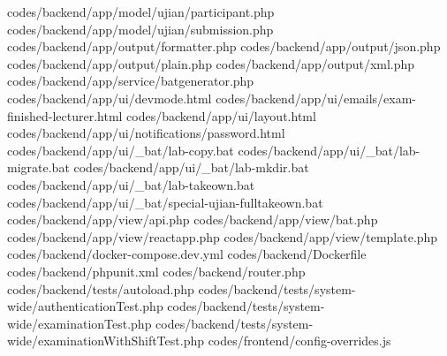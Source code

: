 codes/backend/app/model/ujian/participant.php
codes/backend/app/model/ujian/submission.php
codes/backend/app/output/formatter.php
codes/backend/app/output/json.php
codes/backend/app/output/plain.php
codes/backend/app/output/xml.php
codes/backend/app/service/batgenerator.php
codes/backend/app/ui/devmode.html
codes/backend/app/ui/emails/exam-finished-lecturer.html
codes/backend/app/ui/layout.html
codes/backend/app/ui/notifications/password.html
codes/backend/app/ui/_bat/lab-copy.bat
codes/backend/app/ui/_bat/lab-migrate.bat
codes/backend/app/ui/_bat/lab-mkdir.bat
codes/backend/app/ui/_bat/lab-takeown.bat
codes/backend/app/ui/_bat/special-ujian-fulltakeown.bat
codes/backend/app/view/api.php
codes/backend/app/view/bat.php
codes/backend/app/view/reactapp.php
codes/backend/app/view/template.php
codes/backend/docker-compose.dev.yml
codes/backend/Dockerfile
codes/backend/phpunit.xml
codes/backend/router.php
codes/backend/tests/autoload.php
codes/backend/tests/system-wide/authenticationTest.php
codes/backend/tests/system-wide/examinationTest.php
codes/backend/tests/system-wide/examinationWithShiftTest.php
codes/frontend/config-overrides.js
